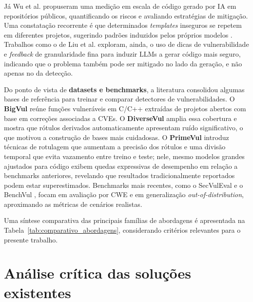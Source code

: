 Já Wu et al. \cite{wu2025} propuseram uma medição em escala de código
gerado por IA em repositórios públicos, quantificando os riscos e
avaliando estratégias de mitigação. Uma constatação recorrente é que
determinados \textit{templates} inseguros se repetem em diferentes
projetos, sugerindo padrões induzidos pelos próprios modelos
\cite{wu2025,stateofcyber2026}. Trabalhos como o de Liu et al.
\cite{liu2025securecodegen} exploram, ainda, o uso de dicas de
vulnerabilidade e \textit{feedback} de granularidade fina para induzir
LLMs a gerar código mais seguro, indicando que o problema também pode
ser mitigado no lado da geração, e não apenas no da detecção.

Do ponto de vista de \textbf{datasets e benchmarks}, a literatura
consolidou algumas bases de referência para treinar e comparar detectores
de vulnerabilidades. O \textbf{BigVul} \cite{fan2020bigvul} reúne
funções vulneráveis em C/C++ extraídas de projetos abertos com base em
correções associadas a CVEs. O \textbf{DiverseVul} \cite{chen2023diversevul}
amplia essa cobertura e mostra que rótulos derivados automaticamente
apresentam ruído significativo, o que motivou a construção de bases mais
cuidadosas. O \textbf{PrimeVul} \cite{ding2024primevul} introduz
técnicas de rotulagem que aumentam a precisão dos rótulos e uma divisão
temporal que evita vazamento entre treino e teste; nele, mesmo modelos
grandes ajustados para código exibem quedas expressivas de desempenho em
relação a benchmarks anteriores, revelando que resultados
tradicionalmente reportados podem estar superestimados. Benchmarks mais
recentes, como o SecVulEval \cite{secvuleval2025} e o BenchVul
\cite{benchvul2025}, focam em avaliação por CWE e em generalização
\textit{out-of-distribution}, aproximando as métricas de cenários
realistas.

Uma síntese comparativa das principais famílias de abordagens é
apresentada na Tabela~\ref{tab:comparativo_abordagens}, considerando
critérios relevantes para o presente trabalho.

\section{Análise crítica das soluções existentes}
\label{sec:analise_critica}


